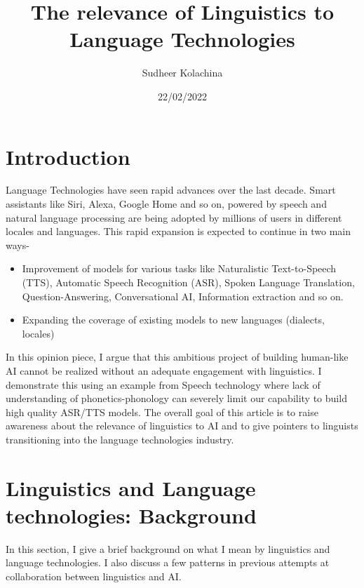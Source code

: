 \documentclass{article}
\title{The relevance of Linguistics to Language Technologies}
\author{Sudheer Kolachina}
\date{22/02/2022}
\begin{document}
\maketitle

\section{Introduction}

Language Technologies have seen rapid advances over the last decade. Smart assistants like Siri, Alexa, Google Home and so on, powered by speech and natural language processing are being adopted by millions of users in different locales and languages. This rapid expansion is expected to continue in two main ways- 
\begin{itemize}
    \item Improvement of models for various tasks like Naturalistic Text-to-Speech (TTS), Automatic Speech Recognition (ASR), Spoken Language Translation,  Question-Answering, Conversational AI, Information extraction and so on. 
    \item Expanding the coverage of existing models to new languages (dialects, locales)
\end{itemize}

In this opinion piece, I argue that this ambitious project of building human-like AI cannot be realized without an adequate engagement with linguistics. I demonstrate this using an example from Speech technology where lack of understanding of phonetics-phonology can severely limit our capability to build high quality ASR/TTS models. The overall goal of this article is to raise awareness about the relevance of linguistics to AI and to give pointers to linguists transitioning into the language technologies industry. 
\section{Linguistics and Language technologies: Background}

In this section, I give a brief background on what I mean by linguistics and language technologies. I also discuss a few patterns in previous attempts at collaboration between linguistics and AI. 
\end{document}
